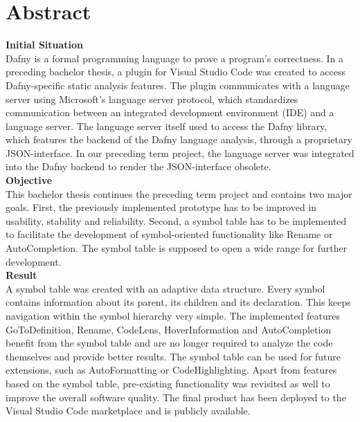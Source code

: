 \section{Abstract}
\label{section:abstract}

\textbf{Initial Situation}\\
Dafny is a formal programming language to prove a program's correctness.
In a preceding bachelor thesis, a plugin for Visual Studio Code was created to access Dafny-specific static analysis features.
The plugin communicates with a language server using Microsoft's language server protocol,
which standardizes communication between an integrated development environment (IDE) and a language server.
The language server itself used to access the Dafny library, which features the backend of the Dafny language analysis,
through a proprietary JSON-interface.
In our preceding term project, the language server was integrated into the Dafny backend to render the JSON-interface obsolete. \\

\textbf{Objective}\\
This bachelor thesis continues the preceding term project and contains two major goals.
First, the previously implemented prototype has to be improved in usability, stability and reliability.
Second, a symbol table has to be implemented to facilitate the development
of symbol-oriented functionality like Rename or AutoCompletion.
The symbol table is supposed to open a wide range for further development.\\

\textbf{Result}\\
A symbol table was created with an adaptive data structure.
Every symbol contains information about its parent, its children and its declaration.
This keeps navigation within the symbol hierarchy very simple.
The implemented features GoToDefinition, Rename, CodeLens, HoverInformation and AutoCompletion benefit from the symbol table and are no longer required to analyze the code themselves and provide better results.
The symbol table can be used for future extensions, such as AutoFormatting or CodeHighlighting.
Apart from features based on the symbol table, pre-existing functionality was revisited as well to improve the overall software quality.
The final product has been deployed to the Visual Studio Code marketplace and is publicly available.
